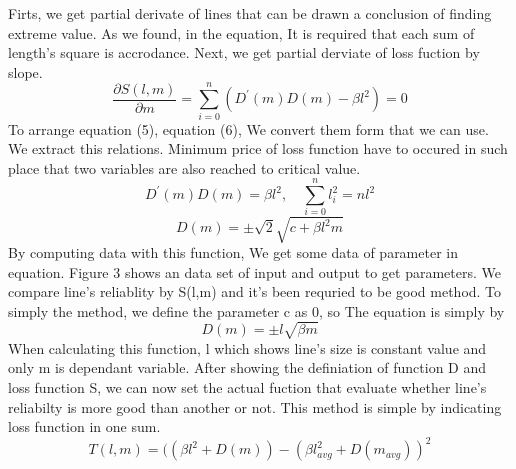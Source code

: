 \documentclass[a4class]{article}
\begin{document}
Firts, we get partial derivate of lines that can be drawn a conclusion of finding extreme value. As we found, in the equation, It is required that each sum of length's square is accrodance. Next, we get partial derviate of loss fuction by slope.
\begin{equation}
\mathit{\frac{\partial S\left(l,m\right)}{\partial m} = \sum_{i=0}^{n}{({D}^{\prime}(m)D(m) - \beta{l}^{2})} = 0}
\end{equation}
To arrange equation (5), equation (6), We convert them form that we can use. We extract this relations. Minimum price of loss function have to occured in such place that two variables are also reached to critical value.
\begin{equation}
\mathit{{D}^{\prime}(m)D(m) = \beta{l}^{2},\quad\sum_{i=0}^{n}{{l}_{i}^{2}} = n{l}^{2}}
\end{equation}
\begin{equation}
\mathit{D(m)=\pm\sqrt{2}\sqrt{c+\beta{l}^{2}m}}
\end{equation}
By computing data with this function, We get some data of parameter in equation. Figure 3 shows an data set of input and output to get parameters. We compare line's reliablity by S(l,m) and it's been requried to be good method. To simply the method, we define the parameter c as 0, so The equation is simply by
\begin{equation}
\mathit{D(m)=\pm l\sqrt{\beta m}}
\end{equation}
When calculating this function, l which shows line's size is constant value and only m is dependant variable. After showing the definiation of function D and loss function S, we can now set the actual fuction that evaluate whether line's reliabilty is more good than another or not. This method is simple by indicating loss function in one sum.
\begin{equation}
\mathit{T(l,m) = ((\beta l^{2}+D(m)) - (\beta {l}_{avg}^{2}+D(m_{avg}))^{2}}
\end{equation}	
\end{document}
